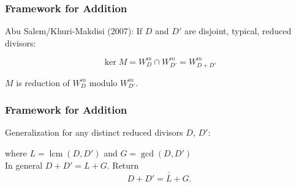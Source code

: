 \documentclass{beamer}
\DeclareMathOperator{\im}{im}
\DeclareMathOperator{\lcm}{lcm}
\renewcommand{\bar}{\overline}
\begin{document}

\begin{frame}[fragile]
\frametitle{Framework for Addition}
  Abu Salem/Khuri-Makdisi (2007): If $D$ and $D'$ are disjoint, typical, reduced divisors:
  \vspace{10pt}
  \begin{center}
  \end{center}

  \[ \ker M = W_D^m \cap W_{D'}^m = W_{D + D'}^m \]
  
  \vspace{10pt}
  $M$ is reduction of $W_D^m$ modulo $W_{D'}^m$.\\
\end{frame}


\begin{frame}[fragile]
\frametitle{Framework for Addition}
  Generalization for any distinct reduced divisors $D$, $D'$:
  \begin{center}
  \end{center}
  where $L = \lcm(D, D')$ and $G = \gcd(D, D')$\\
  \vspace{10pt}
  In general $D + D' = L + G$. Return\\
  \[D + D' = \bar{\bar L} + G.\]
\end{frame}
\end{document}
